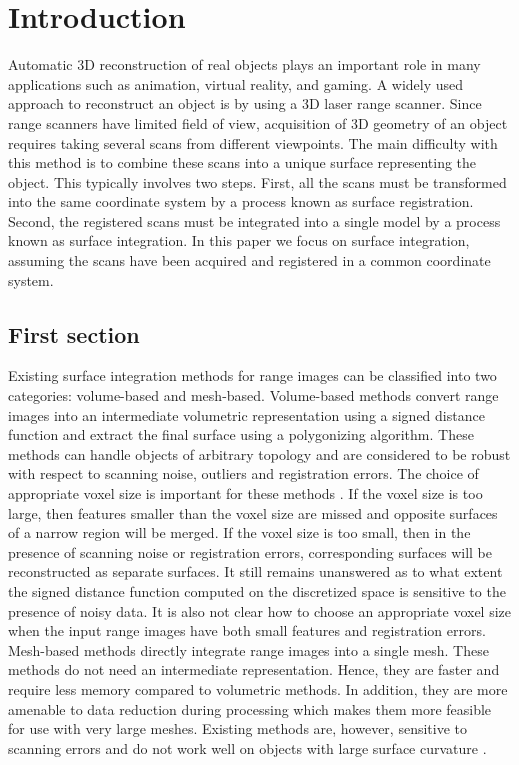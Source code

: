 \chapter{Introduction}
Automatic 3D reconstruction of real objects plays an important role in many applications such as animation, virtual reality, and gaming. A widely used approach to reconstruct an object is by using a 3D laser range scanner. Since range scanners have limited field of view, acquisition of 3D geometry of an object requires taking several scans from different viewpoints. The main difficulty with this method is to combine these scans into a unique surface representing the object. This typically involves two steps. First, all the scans must be transformed into the same coordinate system by a process known as surface registration. Second, the registered scans must be integrated into a single model by a process known as surface integration. In this paper we focus on surface integration, assuming the scans have been acquired and registered in a common coordinate system.

\section{First section}
Existing surface integration methods for range images can be classified into two categories: volume-based and mesh-based. Volume-based methods \cite{Claes:VolM05,Curless:VolM96,Masuda:VolM02,Hoppe:VolM97,Sato:VolM97,Sun:VolM03} convert range images into an intermediate volumetric representation using a signed distance function and extract the final surface using a polygonizing algorithm. These methods can handle objects of arbitrary topology and are considered to be robust with respect to scanning noise, outliers and registration errors. The choice of appropriate voxel size is important for these methods \cite{Claes:VolM05,Curless:VolM96}. If the voxel size is too large, then features smaller than the voxel size are missed and opposite surfaces of a narrow region will be merged. If the voxel size is too small, then in the presence of scanning noise or registration errors, corresponding surfaces will be reconstructed as separate surfaces. It still remains unanswered as to what extent the signed distance function computed on the discretized space is sensitive to the presence of noisy data. It is also not clear how to choose an appropriate voxel size when the input range images have both small features and registration errors. \\

Mesh-based methods \cite{Pito:MeshM96,Rutishauser:MeshM94,Sappa:MeshM00,Soucy:MeshM92,Soucy:MeshM95,Sun:MeshM00,Turk:MeshM94,Zhou:MeshM06} directly integrate range images into a single mesh. These methods do not need an intermediate representation. Hence, they are faster and require less memory compared to volumetric methods. In addition, they are more amenable to data reduction during processing which makes them more feasible for use with very large meshes. Existing methods are, however, sensitive to scanning errors and do not work well on objects with large surface curvature \cite{Curless:VolM96}.



